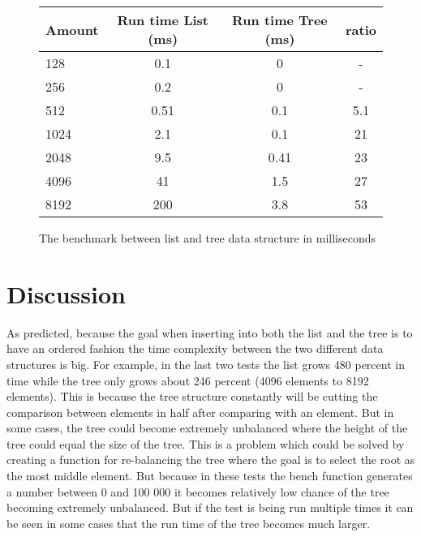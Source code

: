 \documentclass[a4paper,11pt]{article}
\begin{document}
\begin{figure}[H]
\begin{center}
\begin{tabular}{l|c|c|c}
\textbf{Amount} & \textbf{Run time List (ms)} & \textbf{Run time Tree (ms)} & \textbf{ratio}\\
\hline
  128 & 0.1 & 0 & -\\
  256 & 0.2 & 0 & -\\
  512 & 0.51 & 0.1 & 5.1\\
  1024 & 2.1 & 0.1 & 21\\
  2048 & 9.5 & 0.41 & 23\\
  4096 & 41 & 1.5 & 27\\
  8192 & 200 & 3.8 & 53\\
\end{tabular}
\caption{The benchmark between list and tree data structure in milliseconds}
\label{Figure:6}
\end{center}
\end{figure}

\section*{Discussion}
As predicted, because the goal when inserting into both the list and the tree is to have an ordered fashion the time complexity between the two different data structures is big. For example, in the last two tests the list grows 480 percent in time while the tree only grows about 246 percent (4096 elements to 8192 elements). This is because the tree structure constantly will be cutting the comparison between elements in half after comparing with an element. But in some cases, the tree could become extremely unbalanced where the height of the tree could equal the size of the tree. This is a problem which could be solved by creating a function for re-balancing the tree where the goal is to select the root as the most middle element. But because in these tests the bench function generates a number between 0 and 100 000 it becomes relatively low chance of the tree becoming extremely unbalanced. But if the test is being run multiple times it can be seen in some cases that the run time of the tree becomes much larger.
\end{document}

